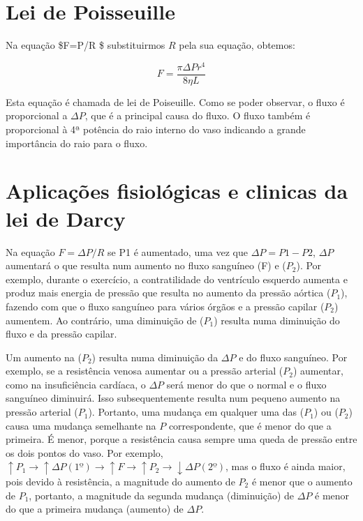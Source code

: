 \documentclass[
  portuguese,
  ]{book}
\begin{document}
\hypertarget{lei-de-poisseuille}{%
\section{Lei de Poisseuille}\label{lei-de-poisseuille}}

Na equação \$F=\Delta P/R \$ substituirmos \(R\) pela sua equação, obtemos:

\begin{equation}
F=\frac{\pi \Delta P r^4}{8 \eta L}
\label{eq:pois}
\end{equation}

Esta equação é chamada de lei de Poiseuille. Como se poder observar, o fluxo é proporcional a \(\Delta P\), que é a principal causa do fluxo. O fluxo também é proporcional à 4ª potência do raio interno do vaso indicando a grande importância do raio para o fluxo.

\hypertarget{aplicauxe7uxf5es-fisioluxf3gicas-e-clinicas-da-lei-de-darcy}{%
\section{Aplicações fisiológicas e clinicas da lei de Darcy}\label{aplicauxe7uxf5es-fisioluxf3gicas-e-clinicas-da-lei-de-darcy}}

Na equação \(F = \Delta P/R\) se P1 é aumentado, uma vez que \(\Delta P = P1 - P2\), \(\Delta P\) aumentará o que resulta num aumento no fluxo sanguíneo (F) e (\(P_2\)). Por exemplo, durante o exercício, a contratilidade do ventrículo esquerdo aumenta e produz mais energia de pressão que resulta no aumento da pressão aórtica (\(P_1\)), fazendo com que o fluxo sanguíneo para vários órgãos e a pressão capilar (\(P_2\)) aumentem. Ao contrário, uma diminuição de (\(P_1\)) resulta numa diminuição do fluxo e da pressão capilar.

Um aumento na (\(P_2\)) resulta numa diminuição da \(\Delta P\) e do fluxo sanguíneo. Por exemplo, se a resistência venosa aumentar ou a pressão arterial (\(P_2\)) aumentar, como na insuficiência cardíaca, o \(\Delta P\) será menor do que o normal e o fluxo sanguíneo diminuirá. Isso subsequentemente resulta num pequeno aumento na pressão arterial (\(P_1\)). Portanto, uma mudança em qualquer uma das (\(P_1\)) ou (\(P_2\)) causa uma mudança semelhante na \(P\) correspondente, que é menor do que a primeira. É menor, porque a resistência causa sempre uma queda de pressão entre os dois pontos do vaso. Por exemplo, \(\uparrow P_1 \to \uparrow \Delta P(1º) \to \uparrow F \to \uparrow P_2 \to \downarrow \Delta P (2º)\), mas o fluxo é ainda maior, pois devido à resistência, a magnitude do aumento de \(P_2\) é menor que o aumento de \(P_1\), portanto, a magnitude da segunda mudança (diminuição) de \(\Delta P\) é menor do que a primeira mudança (aumento) de \(\Delta P\).
\end{document}
